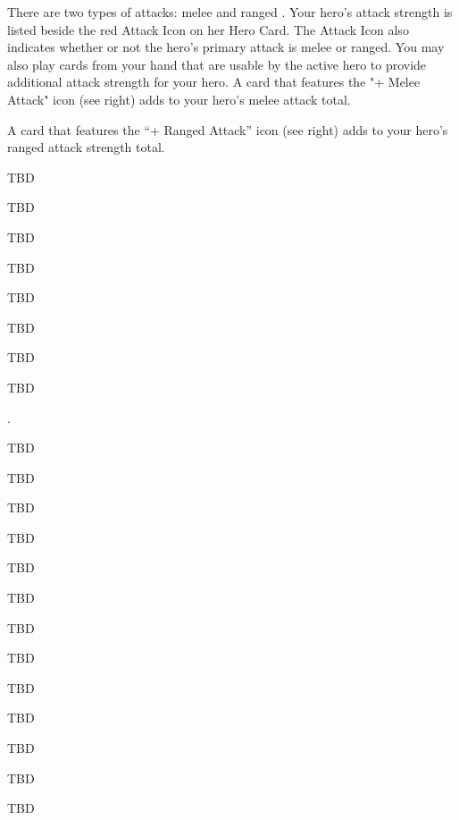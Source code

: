 There are two types of attacks: melee and ranged . Your hero’s attack
strength is listed beside the red Attack Icon on her Hero Card. The Attack Icon
also indicates whether or not the hero’s primary attack is melee or ranged.
You may also play cards from your hand that are usable by the active hero to
provide additional attack strength for your hero. A card that features the
"+ Melee Attack" icon (see right) adds to your hero’s melee attack total.

A card that features the “+ Ranged Attack” icon (see right) adds to your hero’s
ranged attack strength total.

TBD

TBD

TBD

TBD

TBD

TBD

TBD

TBD

.

TBD

TBD

TBD

TBD

TBD

TBD

TBD

TBD

TBD

TBD

TBD

TBD

TBD

